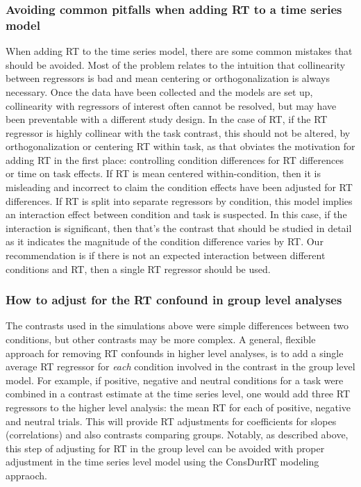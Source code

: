 \documentclass[titlepage,12pt] {article}
\begin{document}
\subsubsection*{Avoiding common pitfalls when adding RT to a time series model}
When adding RT to the time series model, there are some  common mistakes that should be avoided.  Most of the problem relates to the intuition that collinearity between regressors is bad and mean centering or orthogonalization is always necessary.  Once the data have been collected and the models are set up, collinearity with regressors of interest often cannot be resolved, but may have been preventable with a different study design.  In the case of RT, if the RT regressor is highly collinear with the task contrast, this should not be altered, by orthogonalization or centering RT within task, as that obviates the motivation for adding RT in the first place: controlling condition differences for RT differences or time on task effects.  If RT is mean centered within-condition, then it is misleading and incorrect to claim the condition effects have been adjusted for RT differences.  If RT is split into separate regressors by condition, this model implies an interaction effect between condition and task is suspected.  In this case, if the interaction is significant, then that's the contrast that should be studied in detail as it indicates the magnitude of the condition difference varies by  RT.  Our recommendation is if there is not an expected interaction between different conditions and RT, then a single RT regressor should be used.  


\subsubsection*{How to adjust for the RT confound in group level analyses}

The contrasts used in the simulations above were simple differences between two conditions, but other contrasts may be more complex.  A general, flexible approach for removing RT confounds in higher level analyses, is to  add a single average RT regressor for \emph{each} condition involved in the contrast in the group level model.  For example, if positive, negative and neutral conditions for a task were combined in a contrast estimate at the time series level, one would add three RT regressors to the higher level analysis: the mean RT for each of positive, negative and neutral trials.  This will provide RT adjustments for coefficients for slopes (correlations) and also contrasts comparing groups.  Notably, as described above, this step of adjusting for RT in the group level can be avoided with proper adjustment in the time series level model using the ConsDurRT modeling appraoch.
\end{document}
